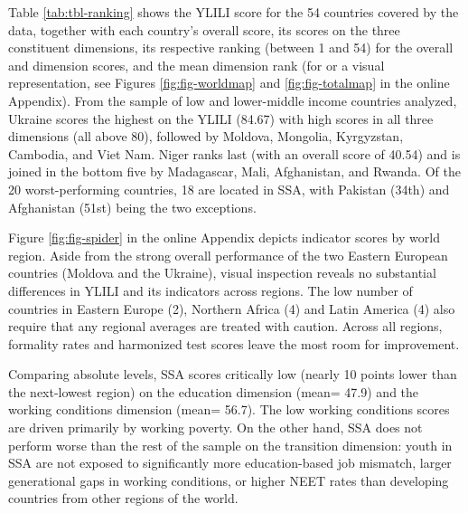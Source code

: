 \documentclass[
  a4paper, twoside, 12pt]{book}
\begin{document}


Table \ref{tab:tbl-ranking} shows the YLILI score for the 54 countries covered by the data, together with each country's overall score, its scores on the three constituent dimensions, its respective ranking (between 1 and 54) for the overall and dimension scores, and the mean dimension rank (for or a visual representation, see Figures \ref{fig:fig-worldmap} and \ref{fig:fig-totalmap} in the online Appendix). From the sample of low and lower-middle income countries analyzed, Ukraine scores the highest on the YLILI (84.67) with high scores in all three dimensions (all above 80), followed by Moldova, Mongolia, Kyrgyzstan, Cambodia, and Viet Nam. Niger ranks last (with an overall score of 40.54) and is joined in the bottom five by Madagascar, Mali, Afghanistan, and Rwanda. Of the 20 worst-performing countries, 18 are located in SSA, with Pakistan (34th) and Afghanistan (51st) being the two exceptions.

Figure \ref{fig:fig-spider} in the online Appendix depicts indicator scores by world region. Aside from the strong overall performance of the two Eastern European countries (Moldova and the Ukraine), visual inspection reveals no substantial differences in YLILI and its indicators across regions. The low number of countries in Eastern Europe (2), Northern Africa (4) and Latin America (4) also require that any regional averages are treated with caution. Across all regions, formality rates and harmonized test scores leave the most room for improvement.

Comparing absolute levels, SSA scores critically low (nearly 10 points lower than the next-lowest region) on the education dimension (mean= 47.9) and the working conditions dimension (mean= 56.7). The low working conditions scores are driven primarily by working poverty. On the other hand, SSA does not perform worse than the rest of the sample on the transition dimension: youth in SSA are not exposed to significantly more education-based job mismatch, larger generational gaps in working conditions, or higher NEET rates than developing countries from other regions of the world.


\end{document}
